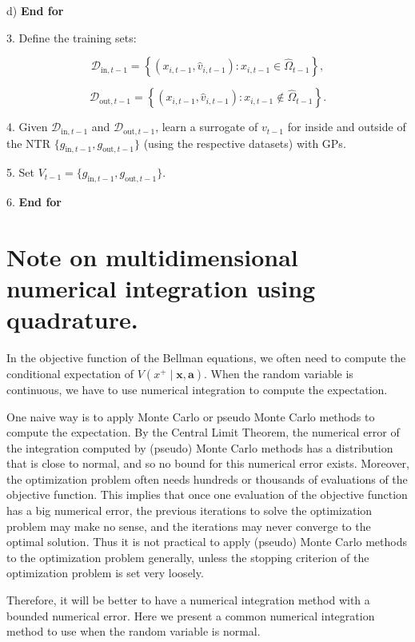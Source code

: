 \documentclass[10pt,a4paper]{article}
\numberwithin{equation}{section} %
\begin{document}
\hspace{0.5cm} d) \textbf{End for}

3. Define the training sets:

\[
\mathcal{D}_{\text{in},t-1} = \left\{(x_{i,t-1}, \hat{v}_{i,t-1}) : x_{i,t-1} \in \hat{\Omega}_{t-1} \right\},
\]

\[
\mathcal{D}_{\text{out},t-1} = \left\{(x_{i,t-1}, \hat{v}_{i,t-1}) : x_{i,t-1} \notin \hat{\Omega}_{t-1} \right\}.
\]

4. Given $\mathcal{D}_{\text{in},t-1}$ and $\mathcal{D}_{\text{out},t-1}$, learn a surrogate of $v_{t-1}$ for inside and outside of the NTR $\{g_{\text{in},t-1}, g_{\text{out},t-1}\}$ (using the respective datasets) with GPs.

5. Set $V_{t-1} = \{g_{\text{in},t-1}, g_{\text{out},t-1}\}$.

6. \textbf{End for}

\section{Note on multidimensional numerical integration using quadrature.}

In the objective function of the Bellman equations, we often need to compute the conditional expectation of \( V(x^+ \mid \mathbf{x}, \mathbf{a}) \). When the random variable is continuous, we have to use numerical integration to compute the expectation.

One naive way is to apply Monte Carlo or pseudo Monte Carlo methods to compute the expectation. By the Central Limit Theorem, the numerical error of the integration computed by (pseudo) Monte Carlo methods has a distribution that is close to normal, and so no bound for this numerical error exists. Moreover, the optimization problem often needs hundreds or thousands of evaluations of the objective function. This implies that once one evaluation of the objective function has a big numerical error, the previous iterations to solve the optimization problem may make no sense, and the iterations may never converge to the optimal solution. Thus it is not practical to apply (pseudo) Monte Carlo methods to the optimization problem generally, unless the stopping criterion of the optimization problem is set very loosely.

Therefore, it will be better to have a numerical integration method with a bounded numerical error. Here we present a common numerical integration method to use when the random variable is normal.
\end{document}
